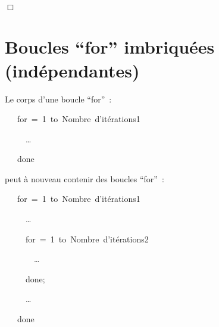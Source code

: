 \begin{exemple}[Flèche]{\rm \ \\[7cm]
%
\vspace*{-7cm}%

\noindent $\Box$ }\end{exemple}


\section{Boucles ``for'' imbriquées (in\-dé\-pen\-dan\-tes)}

Le corps d'une boucle ``for''~:

\mbox{\blc\ \ \ {\mcl for}\hspace{0.3em}\blanc\hspace{0.3em}{\small\rm Identificateur1}\ =\ 1\hspace{0.3em}\blanc\hspace{0.3em}
{\mcl to}\hspace{0.3em}\blanc\hspace{0.3em} {\small\rm Nombre d'itérations1} \hspace{0.3em}\blanc\hspace{0.3em}{\mcl do}}\par
\mbox{\blc\ \ \ \ \ \small\rm  \ldots}\par
\mbox{\blc\ \ \ {\mcl done}}\par

\noindent peut à nouveau contenir des boucles ``for''~:

\mbox{\blc\ \ \ {\mcl for}\hspace{0.3em}\blanc\hspace{0.3em}{\small\rm Identificateur1}\ =\ 1\hspace{0.3em}\blanc\hspace{0.3em}
{\mcl to}\hspace{0.3em}\blanc\hspace{0.3em} {\small\rm Nombre d'itérations1} \hspace{0.3em}\blanc\hspace{0.3em}{\mcl do}}\par
\mbox{\blc\ \ \ \ \ \small\rm  \ldots}\par
\mbox{\blc\ \ \ \ \ {\mcl for}\hspace{0.3em}\blanc\hspace{0.3em}{\small\rm Identificateur2}\ =\ 1\hspace{0.3em}\blanc\hspace{0.3em}
{\mcl to}\hspace{0.3em}\blanc\hspace{0.3em} {\small\rm Nombre d'itérations2} \hspace{0.3em}\blanc\hspace{0.3em}{\mcl do}}\par
\mbox{\blc\ \ \ \ \ \ \ \small\rm  \ldots}\par
\mbox{\blc\ \ \ \ \ {\mcl done}\idt$;$}\par
\mbox{\blc\ \ \ \ \ \small\rm  \ldots}\par
\mbox{\blc\ \ \ {\mcl done}}\par

